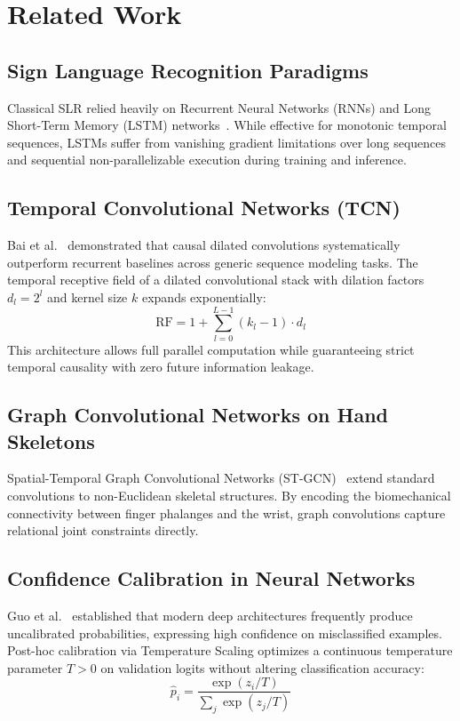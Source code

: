 \documentclass[journal,compsoc]{IEEEtran}
\begin{document}
\section{Related Work}
\subsection{Sign Language Recognition Paradigms}
Classical SLR relied heavily on Recurrent Neural Networks (RNNs) and Long Short-Term Memory (LSTM) networks~\cite{camgoz2018neural}. While effective for monotonic temporal sequences, LSTMs suffer from vanishing gradient limitations over long sequences and sequential non-parallelizable execution during training and inference.

\subsection{Temporal Convolutional Networks (TCN)}
Bai et al.~\cite{bai2018empirical} demonstrated that causal dilated convolutions systematically outperform recurrent baselines across generic sequence modeling tasks. The temporal receptive field of a dilated convolutional stack with dilation factors $d_l = 2^l$ and kernel size $k$ expands exponentially:
\begin{equation}
\text{RF} = 1 + \sum_{l=0}^{L-1} (k_l - 1) \cdot d_l
\label{eq:rf}
\end{equation}
This architecture allows full parallel computation while guaranteeing strict temporal causality with zero future information leakage.

\subsection{Graph Convolutional Networks on Hand Skeletons}
Spatial-Temporal Graph Convolutional Networks (ST-GCN)~\cite{yan2018spatial} extend standard convolutions to non-Euclidean skeletal structures. By encoding the biomechanical connectivity between finger phalanges and the wrist, graph convolutions capture relational joint constraints directly.

\subsection{Confidence Calibration in Neural Networks}
Guo et al.~\cite{guo2017calibration} established that modern deep architectures frequently produce uncalibrated probabilities, expressing high confidence on misclassified examples. Post-hoc calibration via Temperature Scaling optimizes a continuous temperature parameter $T > 0$ on validation logits without altering classification accuracy:
\begin{equation}
\hat{p}_i = \frac{\exp(z_i / T)}{\sum_j \exp(z_j / T)}
\label{eq:temp}
\end{equation}
\end{document}
